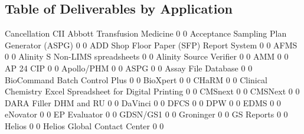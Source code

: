 \documentclass{article}
\begin{document}
\subsection{Table of Deliverables by Application}
\begin{Schunk}
\begin{Soutput}
                                                            Cancellation CII
  Abbott Transfusion Medicine                                          0   0
  Acceptance Sampling Plan Generator (ASPG)                            0   0
  ADD Shop Floor Paper (SFP) Report System                             0   0
  AFMS                                                                 0   0
  Alinity S Non-LIMS spreadsheets                                      0   0
  Alinity Source Verifier                                              0   0
  AMM                                                                  0   0
  AP 24 CIP                                                            0   0
  Apollo/PHM                                                           0   0
  ASPG                                                                 0   0
  Assay File Database                                                  0   0
  BioCommand Batch Control Plus                                        0   0
  BioXpert                                                             0   0
  CHaRM                                                                0   0
  Clinical Chemistry Excel Spreadsheet for Digital Printing            0   0
  CMSnext                                                              0   0
  CMSNext                                                              0   0
  DARA Filler DHM and RU                                               0   0
  DaVinci                                                              0   0
  DFCS                                                                 0   0
  DPW                                                                  0   0
  EDMS                                                                 0   0
  eNovator                                                             0   0
  EP Evaluator                                                         0   0
  GDSN/GS1                                                             0   0
  Groninger                                                            0   0
  GS Reports                                                           0   0
  Helios                                                               0   0
  Helios Global Contact Center                                         0   0

\end{Soutput}
\end{Schunk}
\end{document}
